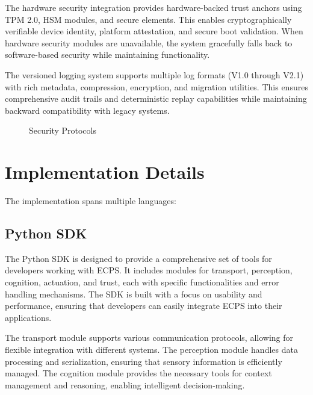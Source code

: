 \documentclass[12pt]{article}
\begin{document}
The hardware security integration provides hardware-backed trust anchors using TPM 2.0, HSM modules, and secure elements. This enables cryptographically verifiable device identity, platform attestation, and secure boot validation. When hardware security modules are unavailable, the system gracefully falls back to software-based security while maintaining functionality.

The versioned logging system supports multiple log formats (V1.0 through V2.1) with rich metadata, compression, encryption, and migration utilities. This ensures comprehensive audit trails and deterministic replay capabilities while maintaining backward compatibility with legacy systems.

\begin{figure}[H]
\centering
{}
\caption{Security Protocols}
\end{figure}

\section{Implementation Details}
The implementation spans multiple languages:

\subsection{Python SDK}
The Python SDK is designed to provide a comprehensive set of tools for developers working with ECPS. It includes modules for transport, perception, cognition, actuation, and trust, each with specific functionalities and error handling mechanisms. The SDK is built with a focus on usability and performance, ensuring that developers can easily integrate ECPS into their applications.

The transport module supports various communication protocols, allowing for flexible integration with different systems. The perception module handles data processing and serialization, ensuring that sensory information is efficiently managed. The cognition module provides the necessary tools for context management and reasoning, enabling intelligent decision-making.
\end{document}
